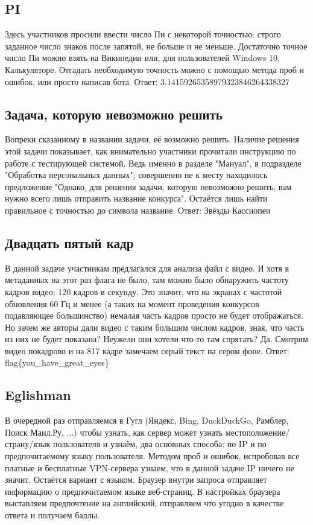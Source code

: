 \documentclass[12pt]{article}
\begin{document}
	\newpage
	\subsection{PI}
	Здесь участников просили ввести число Пи с некоторой точностью: строго заданное число знаков после запятой, не больше и не меньше. Достаточно точное число Пи можно взять на Википедии или, для пользователей Windows 10, Калькуляторе.
	\linebreak
	Отгадать необходимую точность можно с помощью метода проб и ошибок, или просто написав бота.
	\linebreak
	Ответ: 3.14159265358979323846264338327

	\newpage
	\subsection{Задача, которую невозможно решить}
	Вопреки сказанному в названии задачи, её возможно решить. Наличие решения этой задачи показывает, как внимательно участники прочитали инструкцию по работе с тестирующей системой. Ведь именно в разделе "Мануал", в подразделе "Обработка персональных данных", совершенно не к месту находилось предложение "Однако, для решения задачи, которую невозможно решить, вам нужно всего лишь отправить название конкурса". Остаётся лишь найти правильное с точностью до символа название. 
	\linebreak
	Ответ: Звёзды Кассиопеи
	
	\newpage
	\subsection{Двадцать пятый кадр}
	В данной задаче участникам предлагался для анализа файл с видео. И хотя в метаданных на этот раз флага не было, там можно было обнаружить частоту кадров видео: 120 кадров в секунду. Это значит, что на экранах с частотой обновления 60 Гц и менее (а таких на момент проведения конкурсов подавляющее большинство) немалая часть кадров просто не будет отображаться. Но зачем же авторы дали видео с таким большим числом кадров, зная, что часть из них не будет показана? Неужели они хотели что-то там спрятать? Да. Смотрим видео покадрово и на 817 кадре замечаем серый текст на сером фоне.
	\linebreak
	Ответ: flag\{you\_have\_great\_eyes\}

	\newpage
	\subsection{Eglishman}
	В очередной раз отправляемся в Гугл (Яндекс, Bing, DuckDuckGo, Рамблер, Поиск Маил.Ру, ...) чтобы узнать, как сервер может узнать местоположение/страну/язык пользователя и узнаём, два основных способа: по IP и по предпочитаемому языку пользователя. Методом проб и ошибок, испробовав все платные и бесплатные VPN-сервера узнаем, что в данной задаче IP ничего не значит. Остаётся вариант с языком. Браузер внутри запроса отправляет информацию о предпочитаемом языке веб-страниц. В настройках браузера выставляем предпочтение на английский, отправляем что угодно в качестве ответа и получаем баллы.
\end{document}
